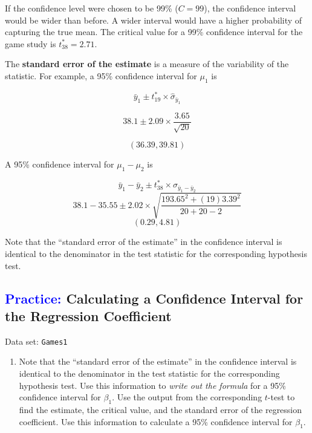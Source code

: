 \documentclass[
]{report}
\providecommand{\tightlist}{%
  \setlength{\itemsep}{0pt}\setlength{\parskip}{0pt}}
\begin{document}
If the confidence level were chosen to be 99\% (\(\scriptstyle C = 99\)), the confidence interval would be wider than before. A wider interval would have a higher probability of capturing the true mean. The critical value for a 99\% confidence interval for the game study is \(\scriptstyle t^*_{38} = 2.71\).

The \textbf{standard error of the estimate} is a measure of the variability of the statistic. For example, a 95\% confidence interval for \(\scriptstyle \mu_1\) is

\[
\bar{y}_1 \pm t^*_{19} \times \hat{\sigma}_{\bar{y}_1}
\]

\[
38.1 \pm 2.09 \times \frac{3.65}{\sqrt{20}}
\]

\[
(36.39, 39.81)
\]

A 95\% confidence interval for \(\scriptstyle \mu_1 - \mu_2\) is

\[
\bar{y}_1 - \bar{y}_2 \pm t^*_{38} \times \hat{\sigma}_{\bar{y}_1 - \bar{y}_2}
\]
\[
38.1 - 35.55 \pm 2.02 \times \sqrt{ \frac{193.65^2 + (19)3.39^2}{20 + 20 - 2} }
\]
\[
(0.29, 4.81)
\]

Note that the ``standard error of the estimate'' in the confidence interval is identical to the denominator in the test statistic for the corresponding hypothesis test.

\hypertarget{calculating-a-confidence-interval-for-the-regression-coefficient}{%
\subsection*{\texorpdfstring{\textcolor{blue}{Practice:} Calculating a Confidence Interval for the Regression Coefficient}{ Calculating a Confidence Interval for the Regression Coefficient}}\label{calculating-a-confidence-interval-for-the-regression-coefficient}}

Data set: \texttt{Games1}

\begin{enumerate}
\def\labelenumi{\arabic{enumi}.}
\setcounter{enumi}{39}
\tightlist
\item
  Note that the ``standard error of the estimate'' in the confidence interval is identical to the denominator in the test statistic for the corresponding hypothesis test. Use this information to \emph{write out the formula} for a 95\% confidence interval for \(\scriptstyle \beta_1\). Use the output from the corresponding \(\scriptstyle t\)-test to find the estimate, the critical value, and the standard error of the regression coefficient. Use this information to calculate a 95\% confidence interval for \(\scriptstyle \beta_1\).
\end{enumerate}
\end{document}
